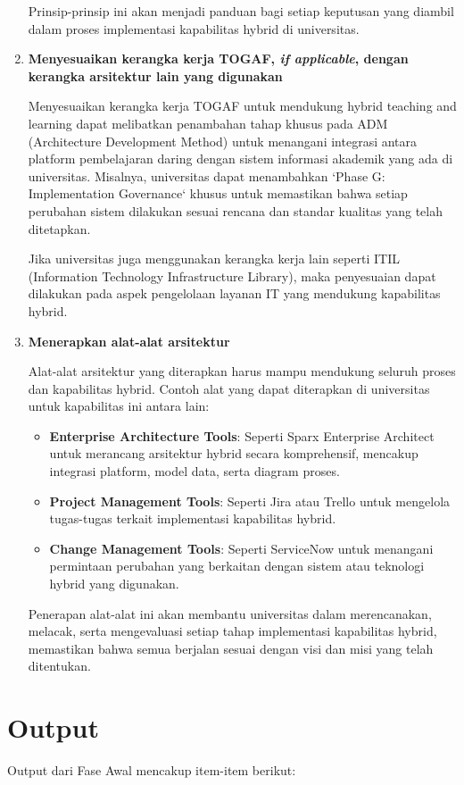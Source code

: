 \begin{enumerate}
	Prinsip-prinsip ini akan menjadi panduan bagi setiap keputusan yang diambil dalam proses implementasi kapabilitas hybrid di universitas.
	
	\item \textbf{Menyesuaikan kerangka kerja TOGAF, \textit{if applicable}, dengan kerangka arsitektur lain yang digunakan}
	
	Menyesuaikan kerangka kerja TOGAF untuk mendukung hybrid teaching and learning dapat melibatkan penambahan tahap khusus pada ADM (Architecture Development Method) untuk menangani integrasi antara platform pembelajaran daring dengan sistem informasi akademik yang ada di universitas. Misalnya, universitas dapat menambahkan `Phase G: Implementation Governance` khusus untuk memastikan bahwa setiap perubahan sistem dilakukan sesuai rencana dan standar kualitas yang telah ditetapkan.
	
	Jika universitas juga menggunakan kerangka kerja lain seperti ITIL (Information Technology Infrastructure Library), maka penyesuaian dapat dilakukan pada aspek pengelolaan layanan IT yang mendukung kapabilitas hybrid.
	
	\item \textbf{Menerapkan alat-alat arsitektur}
	
	Alat-alat arsitektur yang diterapkan harus mampu mendukung seluruh proses dan kapabilitas hybrid. Contoh alat yang dapat diterapkan di universitas untuk kapabilitas ini antara lain:
	\begin{itemize}
		\item \textbf{Enterprise Architecture Tools}: Seperti Sparx Enterprise Architect untuk merancang arsitektur hybrid secara komprehensif, mencakup integrasi platform, model data, serta diagram proses.
		\item \textbf{Project Management Tools}: Seperti Jira atau Trello untuk mengelola tugas-tugas terkait implementasi kapabilitas hybrid.
		\item \textbf{Change Management Tools}: Seperti ServiceNow untuk menangani permintaan perubahan yang berkaitan dengan sistem atau teknologi hybrid yang digunakan.
	\end{itemize}
	
	Penerapan alat-alat ini akan membantu universitas dalam merencanakan, melacak, serta mengevaluasi setiap tahap implementasi kapabilitas hybrid, memastikan bahwa semua berjalan sesuai dengan visi dan misi yang telah ditentukan.
\end{enumerate}

\section{Output}
Output dari Fase Awal mencakup item-item berikut:

